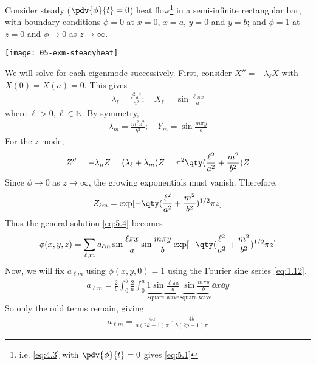 \begin{example}
    Consider steady ($\pdv{\phi}{t} = 0$) heat flow\footnote{i.e. \cref{eq:4.3} with $\pdv{\phi}{t} = 0$ gives \cref{eq:5.1}} in a semi-infinite rectangular bar, with boundary conditions $\phi = 0$ at $x = 0$, $x = a$, $y = 0$ and $y = b$; and $\phi = 1$ at $z = 0$ and $\phi \to 0$ as $z \to \infty$.
    {\par
    \centering 
    \texttt{[image: 05-exm-steadyheat]} 
    \par}
    We will solve for each eigenmode successively.
    First, consider $X'' = -\lambda_\ell X$ with $X(0) = X(a) = 0$.
    This gives
    \begin{align*}
        \lambda_\ell = \frac{l^2 \pi^2}{a^2};\quad X_\ell = \sin \frac{\ell \pi x}{a}
    \end{align*}
    where $\ell > 0, \ell \in \mathbb N$.
    By symmetry,
    \begin{align*}
        \lambda_m = \frac{m^2 \pi^2}{b^2};\quad Y_m = \sin \frac{m \pi y}{b}
    \end{align*}
    For the $z$ mode,
    \begin{align*}
        Z'' = -\lambda_n Z = (\lambda_\ell + \lambda_m) Z = \pi^2\qty(\frac{\ell^2}{a^2} + \frac{m^2}{b^2}) Z
    \end{align*}
    Since $\phi \to 0$ as $z \to \infty$, the growing exponentials must vanish.
    Therefore,
    \begin{align*}
        Z_{\ell m} = \exp[-\qty(\frac{\ell^2}{a^2} + \frac{m^2}{b^2})^{1/2} \pi z]
    \end{align*}
    Thus the general solution \cref{eq:5.4} becomes
    \begin{align*}
        \phi(x,y,z) = \sum_{\ell, m} a_{\ell m} \sin \frac{\ell \pi x}{a} \sin \frac{m \pi y}{b} \exp[-\qty(\frac{\ell^2}{a^2} + \frac{m^2}{b^2})^{1/2} \pi z]
    \end{align*}
    Now, we will fix $a_{\ell m}$ using $\phi(x,y,0) = 1$ using the Fourier sine series \cref{eq:1.12}.
    \begin{align*}
        a_{\ell m} = \frac{2}{b} \int_0^b \frac{2}{a} \int_0^a \underbrace{1 \sin \frac{\ell \pi x}{a}}_{\text{square wave}} \underbrace{\sin \frac{m \pi y}{b}}_{\text{square wave}} \dd{x} \dd{y}
    \end{align*}
    So only the odd terms remain, giving
    \begin{align*}
        a_{\ell m} = \frac{4a}{a(2k-1)\pi} \cdot \frac{4b}{b(2p-1) \pi}
    \end{align*}

\end{example}
